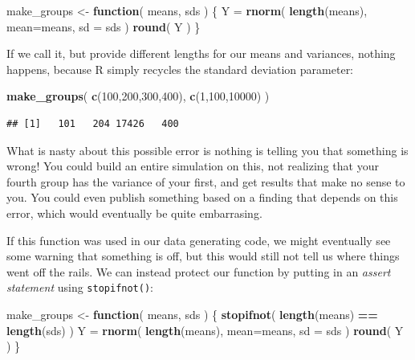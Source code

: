 \documentclass[
]{book}
\newenvironment{Shaded}{\begin{snugshade}}{\end{snugshade}}
\newcommand{\AttributeTok}[1]{\textcolor[rgb]{0.13,0.29,0.53}{#1}}
\newcommand{\ControlFlowTok}[1]{\textcolor[rgb]{0.13,0.29,0.53}{\textbf{#1}}}
\newcommand{\DecValTok}[1]{\textcolor[rgb]{0.00,0.00,0.81}{#1}}
\newcommand{\FunctionTok}[1]{\textcolor[rgb]{0.13,0.29,0.53}{\textbf{#1}}}
\newcommand{\NormalTok}[1]{#1}
\newcommand{\OtherTok}[1]{\textcolor[rgb]{0.56,0.35,0.01}{#1}}
\newcommand{\SpecialCharTok}[1]{\textcolor[rgb]{0.81,0.36,0.00}{\textbf{#1}}}
\begin{document}
\begin{Shaded}
\begin{Highlighting}[]
\NormalTok{make\_groups }\OtherTok{\textless{}{-}} \ControlFlowTok{function}\NormalTok{( means, sds ) \{}
\NormalTok{  Y }\OtherTok{=} \FunctionTok{rnorm}\NormalTok{( }\FunctionTok{length}\NormalTok{(means), }\AttributeTok{mean=}\NormalTok{means, }\AttributeTok{sd =}\NormalTok{ sds )}
  \FunctionTok{round}\NormalTok{( Y )}
\NormalTok{\}}
\end{Highlighting}
\end{Shaded}

If we call it, but provide different lengths for our means and variances, nothing happens, because R simply recycles the standard deviation parameter:

\begin{Shaded}
\begin{Highlighting}[]
\FunctionTok{make\_groups}\NormalTok{( }\FunctionTok{c}\NormalTok{(}\DecValTok{100}\NormalTok{,}\DecValTok{200}\NormalTok{,}\DecValTok{300}\NormalTok{,}\DecValTok{400}\NormalTok{), }
             \FunctionTok{c}\NormalTok{(}\DecValTok{1}\NormalTok{,}\DecValTok{100}\NormalTok{,}\DecValTok{10000}\NormalTok{) )}
\end{Highlighting}
\end{Shaded}

\begin{verbatim}
## [1]   101   204 17426   400
\end{verbatim}

What is nasty about this possible error is nothing is telling you that something is wrong!
You could build an entire simulation on this, not realizing that your fourth group has the variance of your first, and get results that make no sense to you.
You could even publish something based on a finding that depends on this error, which would eventually be quite embarrasing.

If this function was used in our data generating code, we might eventually see some warning that something is off, but this would still not tell us where things went off the rails.
We can instead protect our function by putting in an \emph{assert statement} using \texttt{stopifnot()}:

\begin{Shaded}
\begin{Highlighting}[]
\NormalTok{make\_groups }\OtherTok{\textless{}{-}} \ControlFlowTok{function}\NormalTok{( means, sds ) \{}
  \FunctionTok{stopifnot}\NormalTok{( }\FunctionTok{length}\NormalTok{(means) }\SpecialCharTok{==} \FunctionTok{length}\NormalTok{(sds) )}
\NormalTok{  Y }\OtherTok{=} \FunctionTok{rnorm}\NormalTok{( }\FunctionTok{length}\NormalTok{(means), }\AttributeTok{mean=}\NormalTok{means, }\AttributeTok{sd =}\NormalTok{ sds )}
  \FunctionTok{round}\NormalTok{( Y )}
\NormalTok{\}}
\end{Highlighting}
\end{Shaded}
\end{document}
